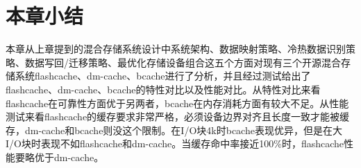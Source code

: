 \section{本章小结}

本章从上章提到的混合存储系统设计中系统架构、数据映射策略、冷热数据识别策略、数据写回/迁移策略、最优化存储设备组合这五个方面对现有三个开源混合存储系统flashcache、dm-cache、bcache进行了分析，并且经过测试给出了flashcache、dm-cache、bcache的特性对比以及性能对比。从特性对比来看flashcache在可靠性方面优于另两者，bcache在内存消耗方面有较大不足。从性能测试来看flashcache的缓存要求非常严格，必须设备边界对齐且长度一致才能被缓存，dm-cache和bcache则没这个限制。在I/O块4k时bcache表现优异，但是在大I/O块时表现不如flashcache和dm-cache。当缓存命中率接近100\%时，flashcache性能要略优于dm-cache。